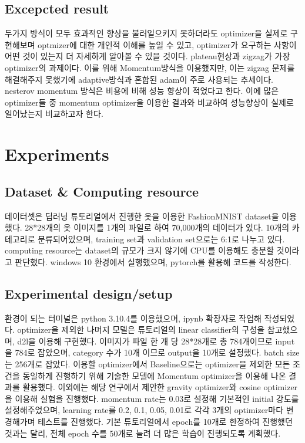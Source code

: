 \documentclass{article}
\begin{document}
\subsection{Excepcted result}
두가지 방식이 모두 효과적인 향상을 불러일으키지 못하더라도 optimizer을 실제로 구현해보며 optmizer에 대한 개인적 이해를 높일 수 있고, optimizer가 요구하는 사항이 어떤 것이 있는지 더 자세하게 알아볼 수 있을 것이다.
plateau현상과 zigzag가 가장 optimizer의 과제이다. 이를 위해 Momentum방식을 이용했지만, 이는 zigzag 문제를 해결해주지 못했기에 adaptive방식과 혼합된 adam이 주로 사용되는 추세이다. nesterov momentum 방식은 비용에 비해 성능 향상이 적었다고 한다. 이에 많은 optimizer들 중 momentum optimizer을 이용한 결과와 비교하여 성능향상이 실제로 일어났는지 비교하고자 한다.

\section{Experiments}
\subsection{Dataset \& Computing resource}
데이터셋은 딥러닝 튜토리얼에서 진행한 옷을 이용한 FashionMNIST dataset을 이용했다. 28*28개의 옷 이미지를 1개의 파일로 하여 70,000개의 데이터가 있다. 10개의 카테고리로 분류되어있으며, training set과 validation set으로는 6:1로 나누고 있다.
computing resource는 dataset의 규모가 크지 않기에 CPU를 이용해도 충분할 것이라고 판단했다. windows 10 환경에서 실행했으며, pytorch를 활용해 코드를 작성한다.
\subsection{Experimental design/setup}
환경이 되는 터미널은 python 3.10.4를 이용했으며, ipynb 확장자로 작업해 작성되었다. optimizer을 제외한 나머지 모델은 튜토리얼의 linear classifier의 구성을 참고했으며, d2l을 이용해 구현했다. 이미지가 파일 한  개 당 28*28개로 총 784개이므로 input을 784로 잡았으며, category 수가 10개 이므로 output을 10개로 설정했다. batch size는 256개로 잡았다. 이용할 optimizer에서 Baseline으로는 optimizer을 제외한 모든 조건을 동일하게 진행하기 위해 기술한 모델에 Momentum optimizer을 이용해 나온 결과를 활용했다. 이외에는 해당 연구에서 제안한 gravity optimizer와 cosine optimizer을 이용해 실험을 진행했다. momentum rate는 0.03로 설정해 기본적인 initial 강도를 설정해주었으며, learning rate를 0.2, 0.1, 0.05, 0.01로 각각 3개의 optimizer마다 변경해가며 테스트를 진행했다. 기본 튜토리얼에서 epoch를 10개로 한정하여 진행했던 것과는 달리, 전체 epoch 수를 50개로 늘려 더 많은 학습이 진행되도록 계획했다.
\end{document}
